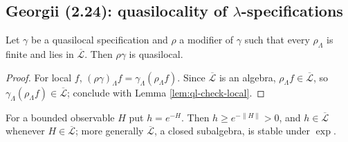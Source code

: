 \subsection*{Georgii (2.24): quasilocality of \texorpdfstring{$\lambda$}{lambda}-specifications}

\begin{proposition}[Georgii (2.24)(a)]
    \label{prop:ql-modification}
    \leanok

    Let $\gamma$ be a quasilocal specification and $\rho$ a modifier of $\gamma$ such that every
    $\rho_\Lambda$ is finite and lies in $\overline{\mathcal{L}}$. Then $\rho\gamma$ is quasilocal.
\end{proposition}
\begin{proof}
    \leanok

    For local $f$, $(\rho\gamma)_\Lambda f = \gamma_\Lambda(\rho_\Lambda f)$. Since
    $\overline{\mathcal{L}}$ is an algebra, $\rho_\Lambda f \in \overline{\mathcal{L}}$, so
    $\gamma_\Lambda(\rho_\Lambda f) \in \overline{\mathcal{L}}$; conclude with
    Lemma \ref{lem:ql-check-local}.
\end{proof}

\begin{definition}
    \label{def:ql-boltzmann}
    \leanok

    For a bounded observable $H$ put $h = e^{-H}$. Then $h \ge e^{-\|H\|} > 0$, and
    $h \in \overline{\mathcal{L}}$ whenever $H \in \overline{\mathcal{L}}$; more generally
    $\overline{\mathcal{L}}$, a closed subalgebra, is stable under $\exp$.
\end{definition}

